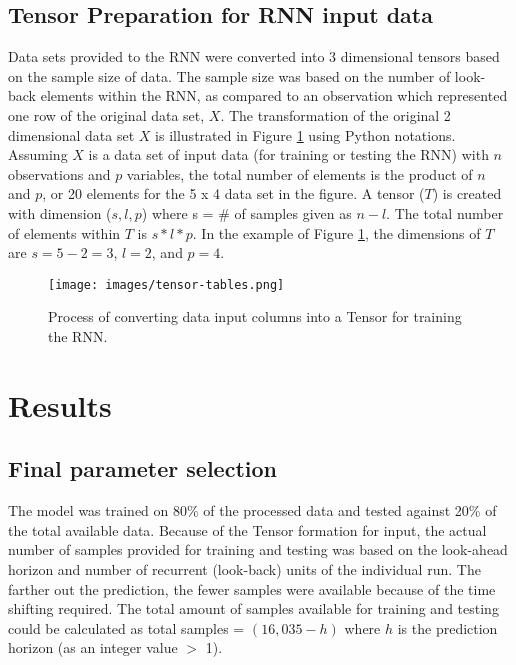 \subsection{Tensor Preparation for RNN input data}
Data sets provided to the RNN were converted into 3 dimensional tensors based on the sample size of data. The sample size was based on the number of look-back elements within the RNN, as compared to an observation which represented one row of the original data set, $X$.  The transformation of the original 2 dimensional data set $X$ is illustrated in Figure \ref{fig:tensor-tables} using Python notations. Assuming $X$ is a data set of input data (for training or testing the RNN) with $n$ observations and $p$ variables, the total number of elements is the product of $n$ and $p$, or 20 elements for the 5 x 4 data set in the figure. A tensor ($T$) is created with dimension ($s, l, p$) where s = \# of samples given as $n - l$. The total number of elements within $T$ is $s*l*p$. In the example of Figure \ref{fig:tensor-tables}, the dimensions of $T$ are $s = 5 - 2 = 3$, $l = 2$, and $p = 4$.    
%
\begin{figure}[H]
\centering
\texttt{[image: images/tensor-tables.png]}
\caption{Process of converting data input columns into a Tensor for training the RNN.}
\label{fig:tensor-tables}
\end{figure}

\section{Results}

\subsection{Final parameter selection}
The model was trained on 80\% of the processed data and tested against 20\% of the total available data. Because of the Tensor formation for input, the actual number of samples provided for training and testing was based on the look-ahead horizon and number of recurrent (look-back) units of the individual run. The farther out the prediction, the fewer samples were available because of the time shifting required. The total amount of samples available for training and testing could be calculated as total samples = $(16,035 - h)$ where $h$ is the prediction horizon (as an integer value $>$ 1). 

